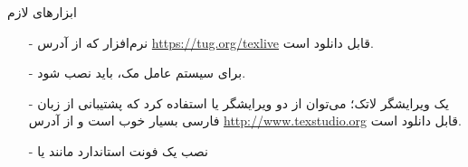 \begin{frame}{ابزار‌های لازم}
\begin{itemize}\itemr
\item[-]
نرم‌افزار 
که از آدرس
\url{https://tug.org/texlive}
قابل دانلود است.

\item[-]
برای سیستم عامل مک، باید 
نصب شود.

\item[-]
یک ویرایشگر لاتک؛ می‌توان از دو ویرایشگر 
یا 
استفاده کرد که پشتیبانی 
از زبان‌ فارسی بسیار خوب است و از آدرس
\url{http://www.texstudio.org}
قابل دانلود است.

\item[-]
نصب یک فونت استاندارد مانند 
یا 

\end{itemize}
\end{frame}